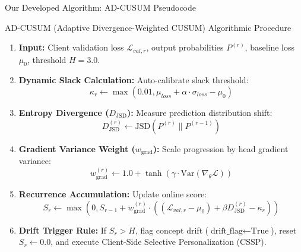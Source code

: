 \documentclass[aspectratio=169, 11pt]{beamer}
\begin{document}
\begin{frame}{Our Developed Algorithm: AD-CUSUM Pseudocode}
    \begin{block}{AD-CUSUM (Adaptive Divergence-Weighted CUSUM) Algorithmic Procedure}
        \scriptsize
        \begin{enumerate}
            \item \textbf{Input:} Client validation loss $\mathcal{L}_{val, r}$, output probabilities $P^{(r)}$, baseline loss $\mu_0$, threshold $H = 3.0$.
            \item \textbf{Dynamic Slack Calculation:} Auto-calibrate slack threshold:
            \[ \kappa_r \leftarrow \max(0.01, \mu_{loss} + \alpha \cdot \sigma_{loss} - \mu_0) \]
            \item \textbf{Entropy Divergence ($D_{\text{JSD}}$):} Measure prediction distribution shift:
            \[ D_{\text{JSD}}^{(r)} \leftarrow \text{JSD}\left(P^{(r)} \parallel P^{(r-1)}\right) \]
            \item \textbf{Gradient Variance Weight ($w_{\text{grad}}$):} Scale progression by head gradient variance:
            \[ w_{\text{grad}}^{(r)} \leftarrow 1.0 + \tanh\left(\gamma \cdot \text{Var}(\nabla_\theta \mathcal{L})\right) \]
            \item \textbf{Recurrence Accumulation:} Update online score:
            \[ S_r \leftarrow \max\left(0, S_{r-1} + w_{\text{grad}}^{(r)} \cdot \left((\mathcal{L}_{val, r} - \mu_0) + \beta D_{\text{JSD}}^{(r)} - \kappa_r\right)\right) \]
            \item \textbf{Drift Trigger Rule:} If $S_r > H$, flag concept drift ($\text{drift\_flag} \leftarrow \text{True}$), reset $S_r \leftarrow 0.0$, and execute Client-Side Selective Personalization (CSSP).
        \end{enumerate}
    \end{block}
\end{frame}
\end{document}
